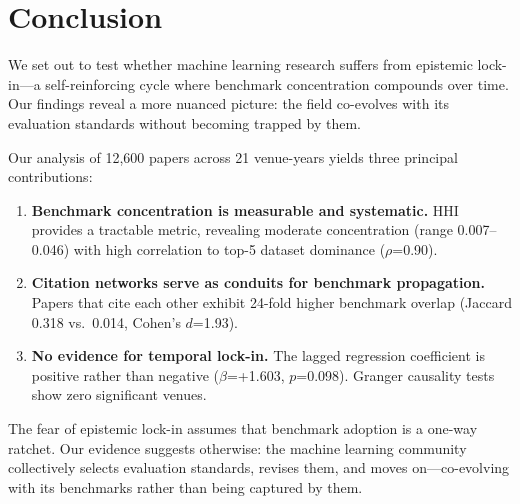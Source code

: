 \section{Conclusion}

We set out to test whether machine learning research suffers from epistemic lock-in---a self-reinforcing cycle where benchmark concentration compounds over time. Our findings reveal a more nuanced picture: the field co-evolves with its evaluation standards without becoming trapped by them.

Our analysis of 12,600 papers across 21 venue-years yields three principal contributions:

\begin{enumerate}
    \item \textbf{Benchmark concentration is measurable and systematic.} HHI provides a tractable metric, revealing moderate concentration (range 0.007--0.046) with high correlation to top-5 dataset dominance ($\rho$=0.90).

    \item \textbf{Citation networks serve as conduits for benchmark propagation.} Papers that cite each other exhibit 24-fold higher benchmark overlap (Jaccard 0.318 vs.\ 0.014, Cohen's $d$=1.93).

    \item \textbf{No evidence for temporal lock-in.} The lagged regression coefficient is positive rather than negative ($\beta$=+1.603, $p$=0.098). Granger causality tests show zero significant venues.
\end{enumerate}

The fear of epistemic lock-in assumes that benchmark adoption is a one-way ratchet. Our evidence suggests otherwise: the machine learning community collectively selects evaluation standards, revises them, and moves on---co-evolving with its benchmarks rather than being captured by them.
